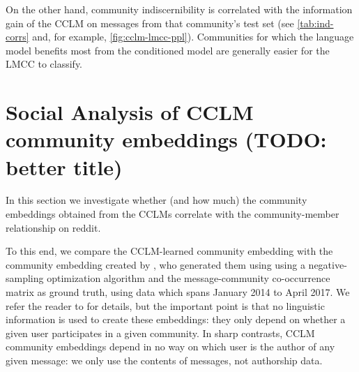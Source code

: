\documentclass[11pt]{article}
\begin{document}

On the other hand, community indiscernibility is correlated with
the information gain of the CCLM
on messages from that community's test set
(see \cref{tab:ind-corrs} and, for example, \cref{fig:cclm-lmcc-ppl}).
Communities for which the language model benefits most from 
the conditioned model are generally easier for the LMCC to classify.











\section{Social Analysis of CCLM community embeddings (TODO: better title)}

In this section we investigate whether (and how much) the community
embeddings obtained from the CCLMs correlate with the community-member
relationship on reddit.

To this end, we compare the CCLM-learned community
embedding with the community embedding created by \citet{Kumar2018},
who generated them using using a negative-sampling optimization
algorithm and the message-community co-occurrence matrix as ground
truth, using data which spans January 2014 to April 2017.
We refer the reader
to \citet{Kumar2018}
for details, but the important point is that no linguistic
information is used to create these embeddings: they only depend on
whether a given user participates in a given
community. In sharp contrasts, CCLM community embeddings depend in no
way on which user is the author of any given message: we only use the
contents of messages, not authorship data.
%
\end{document}
